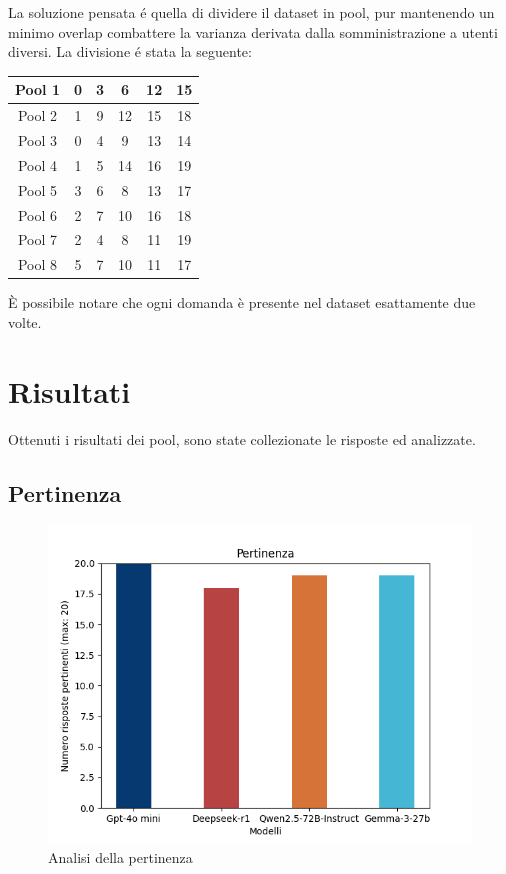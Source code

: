 \documentclass{article}
\begin{document}
La soluzione pensata \'e quella di dividere il dataset in pool, pur mantenendo un minimo overlap combattere la varianza derivata dalla somministrazione a utenti diversi.
La divisione \'e stata la seguente:

\begin{center}
    \begin{tabular}{c||c|c|c|c|c}
    Pool 1 & 0 & 3 & 6 & 12 & 15 \\
    \hline 
    Pool 2 & 1 & 9 & 12 & 15 & 18 \\
    \hline 
    Pool 3 & 0 & 4 & 9 & 13 & 14 \\
    \hline 
    Pool 4 & 1 & 5 & 14 & 16 & 19 \\
    \hline 
    Pool 5 & 3 & 6 & 8 & 13 & 17 \\
    \hline 
    Pool 6 & 2 & 7 & 10 & 16 & 18 \\
    \hline 
    Pool 7 & 2 & 4 & 8 & 11 & 19 \\
    \hline 
    Pool 8 & 5 & 7 & 10 & 11 & 17 \\
\end{tabular}
\end{center}
\`E possibile notare che ogni domanda è presente nel dataset esattamente due volte.



\section{Risultati}
Ottenuti i risultati dei pool, sono state collezionate le risposte ed analizzate.

\subsection{Pertinenza}

\begin{figure}[h!]
    \centering
    \includegraphics[width=0.8\linewidth]{grafici/plot_2025-03-25 11-49-32_0.png}
    \caption{Analisi della pertinenza}
    \label{chart:pertinenza}
\end{figure}
\end{document}
